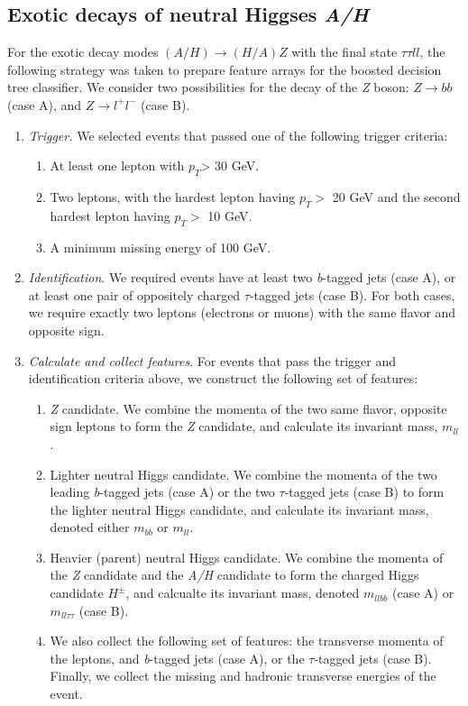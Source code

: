 {\subsection{Exotic decays of neutral Higgses \emph{A/H}}\label{subsec:A_HZ_analysis}
For the exotic decay modes $(A/H)\rightarrow(H/A)Z$ with the final state $\tau\tau ll$, the following strategy was taken to prepare feature arrays for the boosted decision tree classifier. We consider two possibilities for the decay of the \emph{Z} boson: $Z\rightarrow bb$ (case A), and $Z\rightarrow l^+l^-$ (case B).
\begin{enumerate}
  \item \emph{Trigger.} We selected events that passed one of the following trigger criteria:
    \begin{enumerate}
      \item At least one lepton with $p_T$> 30 GeV.
      \item Two leptons, with the hardest lepton having $p_T > $ 20 GeV and the second hardest lepton having $p_T > $ 10 GeV.
      \item A minimum missing energy of 100 GeV.
    \end{enumerate}
  \item \emph{Identification}. We required events have at least two \emph{b}-tagged jets (case A), or at least one pair of oppositely charged $\tau$-tagged jets (case B). For both cases, we require exactly two leptons (electrons or muons) with the same flavor and opposite sign.
  \item\emph{Calculate and collect features}. For events that pass the trigger and identification criteria above, we construct the following set of features:
    \begin{enumerate}
      \item {\emph{Z} candidate}. We combine the momenta of the two same flavor, opposite sign leptons to form the \emph{Z} candidate, and calculate its invariant mass,  $m_{ll}$.
      \item {Lighter neutral Higgs candidate}. We combine the momenta of the two leading \emph{b}-tagged jets (case A) or the two $\tau$-tagged jets (case B) to form the lighter neutral Higgs candidate, and calculate its invariant mass, denoted either $m_{bb}$ or $m_{ll}$.
      \item {Heavier (parent) neutral Higgs candidate}. We combine the momenta of the \emph{Z} candidate and the \emph{A/H} candidate to form the charged Higgs candidate $H^\pm$, and calcualte its invariant mass, denoted $m_{llbb}$ (case A) or $m_{ll\tau\tau}$ (case B).
      \item We also collect the following set of features: the transverse momenta of the leptons, and \emph{b}-tagged jets (case A), or the $\tau$-tagged jets (case B). Finally, we collect the missing and hadronic transverse energies of the event.
    \end{enumerate}
\end{enumerate}
}
